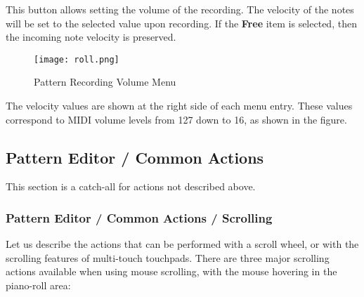    This button allows setting the volume of the recording.
   The velocity of the notes will be set to the selected value upon recording.
   If the \textbf{Free} item is selected, then the incoming note velocity is
   preserved.

\begin{figure}[H]
   \centering 
   \texttt{[image: roll.png]}
   \caption{Pattern Recording Volume Menu}
   \label{fig:pattern_edit_recording_volume_menu}
\end{figure}

   The velocity values are shown at the right side of each menu entry.
   These values correspond to MIDI volume levels from 127 down to 16, as
   shown in the figure.


\subsection{Pattern Editor / Common Actions}
\label{subsec:pattern_editor_common}

   This section is a catch-all for actions not described above.

\subsubsection{Pattern Editor / Common Actions / Scrolling}
\label{subsec:pattern_editor_scrolling}

   Let us describe the actions that can be performed with a
   scroll wheel, or with the scrolling features of multi-touch touchpads.
   There are three major scrolling actions available when using mouse
   scrolling, with the mouse hovering in the piano-roll area:

